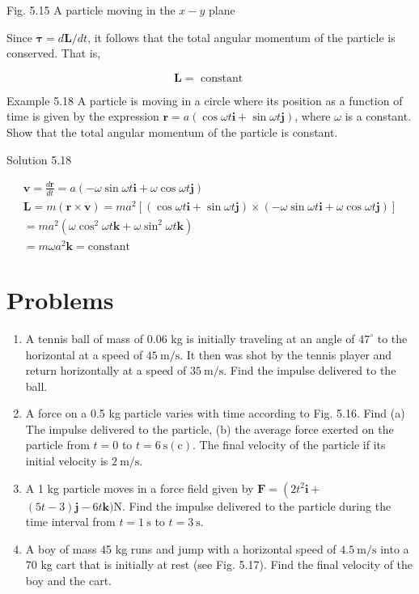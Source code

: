 \documentclass[10pt]{article}
\begin{document}
Fig. 5.15 A particle moving in the $x-y$ plane

Since $\boldsymbol{\tau}=d \mathbf{L} / d t$, it follows that the total angular momentum of the particle is conserved. That is,

$$
\mathbf{L}=\text { constant }
$$

Example 5.18 A particle is moving in a circle where its position as a function of time is given by the expression $\mathbf{r}=a(\cos \omega t \mathbf{i}+\sin \omega t \mathbf{j})$, where $\omega$ is a constant. Show that the total angular momentum of the particle is constant.

Solution 5.18

$$
\begin{gathered}
\mathbf{v}=\frac{d \mathbf{r}}{d t}=a(-\omega \sin \omega t \mathbf{i}+\omega \cos \omega t \mathbf{j}) \\
\mathbf{L}=m(\mathbf{r} \times \mathbf{v})=m a^{2}[(\cos \omega t \mathbf{i}+\sin \omega t \mathbf{j}) \times(-\omega \sin \omega t \mathbf{i}+\omega \cos \omega t \mathbf{j})] \\
=m a^{2}\left(\omega \cos ^{2} \omega t \mathbf{k}+\omega \sin ^{2} \omega t \mathbf{k}\right) \\
=m \omega a^{2} \mathbf{k}=\mathrm{constant}
\end{gathered}
$$

\section*{Problems}
\begin{enumerate}
  \item A tennis ball of mass of 0.06 kg is initially traveling at an angle of $47^{\circ}$ to the horizontal at a speed of $45 \mathrm{~m} / \mathrm{s}$. It then was shot by the tennis player and return horizontally at a speed of $35 \mathrm{~m} / \mathrm{s}$. Find the impulse delivered to the ball.
  \item A force on a 0.5 kg particle varies with time according to Fig. 5.16. Find (a) The impulse delivered to the particle, (b) the average force exerted on the particle from $t=0$ to $t=6 \mathrm{~s}(\mathrm{c})$. The final velocity of the particle if its initial velocity is $2 \mathrm{~m} / \mathrm{s}$.
  \item A 1 kg particle moves in a force field given by $\mathbf{F}=\left(2 t^{2} \mathbf{i}+\right.$ $(5 t-3) \mathbf{j}-6 t \mathbf{k}) \mathrm{N}$. Find the impulse delivered to the particle during the time interval from $t=1 \mathrm{~s}$ to $t=3 \mathrm{~s}$.
  \item A boy of mass 45 kg runs and jump with a horizontal speed of $4.5 \mathrm{~m} / \mathrm{s}$ into a 70 kg cart that is initially at rest (see Fig. 5.17). Find the final velocity of the boy and the cart.
\end{enumerate}
\end{document}
